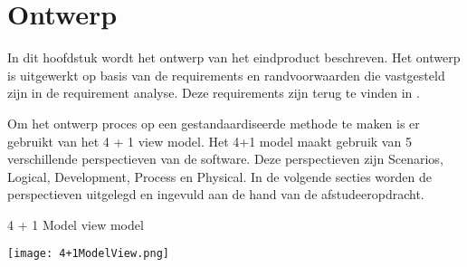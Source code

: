 \chapter{Ontwerp}
In dit hoofdstuk wordt het ontwerp van het eindproduct beschreven.
Het ontwerp is uitgewerkt op basis van de requirements en randvoorwaarden die vastgesteld zijn in de requirement analyse.
Deze requirements zijn terug te vinden in \parencite{DanteOnderzoek}.

\whitespace
Om het ontwerp proces op een gestandaardiseerde methode te maken is er gebruikt van het 4 + 1 view model.
Het 4+1 model maakt gebruik van 5 verschillende perspectieven van de software.
Deze perspectieven zijn Scenarios, Logical, Development, Process en Physical.
In de volgende secties worden de perspectieven uitgelegd en ingevuld aan de hand van de afstudeeropdracht.

\whitespace[2]
\begin{graphic}
	\captionsetup{type=figure}
    \caption{4 + 1 Model view model \parencite{4+1ViewModelPaper}}
	\texttt{[image: 4+1ModelView.png]}
	\label{fig:4p1Model}
\end{graphic}

\newpage





